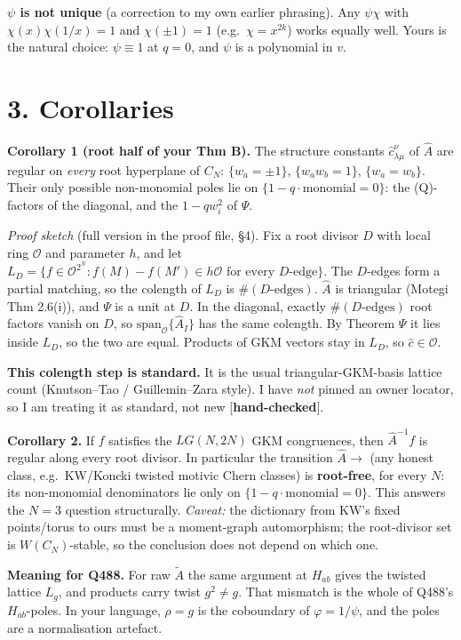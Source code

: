 \documentclass[10pt]{article}
\newcommand{\At}{\tilde A}
\newcommand{\Ah}{\widehat A}
\begin{document}
\textbf{$\psi$ is not unique} (a correction to my own earlier phrasing). Any $\psi\chi$ with $\chi(x)\chi(1/x)=1$ and $\chi(\pm1)=1$ (e.g.\ $\chi=x^{2k}$) works equally well.
Yours is the natural choice: $\psi\equiv1$ at $q=0$, and $\psi$ is a polynomial in $v$.

\section*{3. Corollaries }
\textbf{Corollary 1 (root half of your Thm B).} The structure constants $\hat c^\nu_{\lambda\mu}$ of $\Ah$ are regular on \emph{every} root hyperplane of $C_N$:
$\{w_a=\pm1\}$, $\{w_aw_b=1\}$, $\{w_a=w_b\}$. Their only possible non-monomial poles lie on $\{1-q\cdot\text{monomial}=0\}$:
the (Q)-factors of the diagonal, and the $1-qw_i^2$ of $\Psi$.

\emph{Proof sketch} (full version in the proof file, \S4). Fix a root divisor $D$ with local ring $\mathcal O$ and parameter $h$, and let
$L_D=\{f\in\mathcal O^{2^N}: f(M)-f(M')\in h\mathcal O \text{ for every $D$-edge}\}$. The $D$-edges form a partial matching, so the colength of $L_D$ is $\#(D\text{-edges})$.
$\Ah$ is triangular (Motegi Thm 2.6(i)), and $\Psi$ is a unit at $D$. In the diagonal, exactly $\#(D\text{-edges})$ root factors vanish on $D$, so $\mathrm{span}_{\mathcal O}\{\Ah_I\}$ has the same
colength. By Theorem $\Psi$ it lies inside $L_D$, so the two are equal. Products of GKM vectors stay in $L_D$, so $\hat c\in\mathcal O$.

\textbf{This colength step is standard.} It is the usual triangular-GKM-basis lattice count (Knutson--Tao / Guillemin--Zara style). I have \emph{not} pinned an owner locator,
so I am treating it as standard, not new [\textbf{hand-checked}].

\textbf{Corollary 2.} If $f$ satisfies the $LG(N,2N)$ GKM congruences, then $\Ah^{-1}f$ is regular along every root divisor. In particular the transition
$\Ah\to$ (any honest class, e.g.\ KW/Koncki twisted motivic Chern classes) is \textbf{root-free}, for every $N$: its non-monomial denominators lie only on
$\{1-q\cdot\text{monomial}=0\}$. This answers the $N=3$ question structurally. \emph{Caveat:} the dictionary from KW's fixed points/torus to ours must be a moment-graph automorphism;
the root-divisor set is $W(C_N)$-stable, so the conclusion does not depend on which one.

\textbf{Meaning for Q488.} For raw $\At$ the same argument at $H_{ab}$ gives the twisted lattice $L_g$, and products carry twist $g^2\neq g$. That mismatch is the whole of
Q488's $H_{ab}$-poles. In your language, $\rho=g$ is the coboundary of $\varphi=1/\psi$, and the poles are a normalisation artefact.
\end{document}
